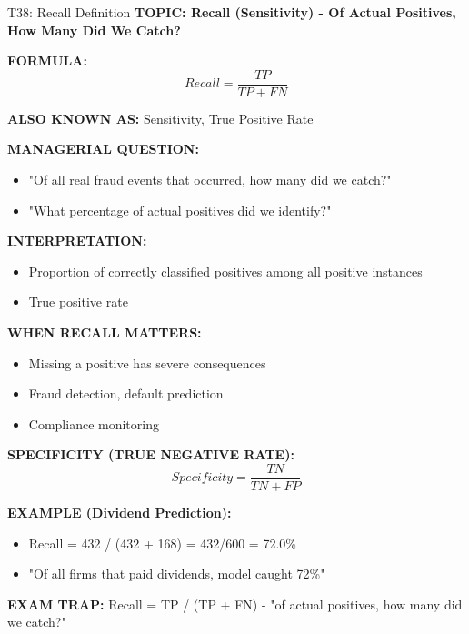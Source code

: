 \documentclass[8pt]{beamer}
\begin{document}
	\begin{frame}{T38: Recall Definition}
		\fontsize{6.5}{7.5}\selectfont
		\textbf{TOPIC: Recall (Sensitivity) - Of Actual Positives, How Many Did We Catch?}
		
		\vspace{0.1cm}
		\textbf{FORMULA:}
		\[
		Recall = \frac{TP}{TP + FN}
		\]
		
		\vspace{0.1cm}
		\textbf{ALSO KNOWN AS:} Sensitivity, True Positive Rate
		
		\vspace{0.1cm}
		\textbf{MANAGERIAL QUESTION:}
		\begin{itemize}
			\item "Of all real fraud events that occurred, how many did we catch?"
			\item "What percentage of actual positives did we identify?"
		\end{itemize}
		
		\vspace{0.1cm}
		\textbf{INTERPRETATION:}
		\begin{itemize}
			\item Proportion of correctly classified positives among all positive instances
			\item True positive rate
		\end{itemize}
		
		\vspace{0.1cm}
		\textbf{WHEN RECALL MATTERS:}
		\begin{itemize}
			\item Missing a positive has severe consequences
			\item Fraud detection, default prediction
			\item Compliance monitoring
		\end{itemize}
		
		\vspace{0.1cm}
		\textbf{SPECIFICITY (TRUE NEGATIVE RATE):}
		\[
		Specificity = \frac{TN}{TN + FP}
		\]
		
		\vspace{0.1cm}
		\textbf{EXAMPLE (Dividend Prediction):}
		\begin{itemize}
			\item Recall = 432 / (432 + 168) = 432/600 = 72.0\%
			\item "Of all firms that paid dividends, model caught 72\%"
		\end{itemize}
		
		\textcolor{myred}{\textbf{EXAM TRAP:}} Recall = \textcolor{myblue}{TP / (TP + FN)} - "of actual positives, how many did we catch?"
	\end{frame}
	
\end{document}
